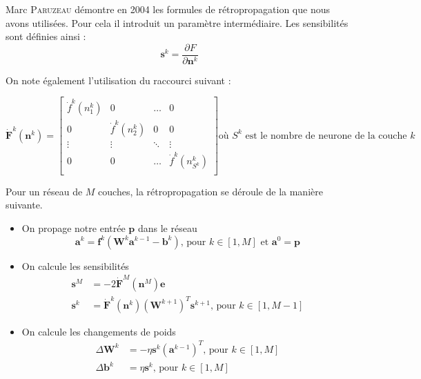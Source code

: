 Marc \textsc{Paruzeau} démontre en 2004 les formules de rétropropagation que nous avons utilisées. Pour cela il introduit un paramètre %
intermédiaire. Les sensibilités sont définies ainsi :
\begin{equation}
 \mathbf{s}^k = \frac{\partial F}{\partial \mathbf{n}^k}
\end{equation}

On note également l'utilisation du raccourci suivant : 

\begin{equation}
  \displaystyle
 \mathbf{\dot F}^k(\mathbf{n}^k) =
 \begin{bmatrix}
  \dot f ^k(n^k_1) & 0 & \ldots & 0\\
  0 & \dot f^k(n^k_2) & 0 & 0\\
  \vdots & \vdots & \ddots & \vdots \\
  0 & 0 & \ldots & \dot f^k(n^k_{S^k})\\
 \end{bmatrix}
 \text{où $S^k$ est le nombre de neurone de la couche $k$}
\end{equation}

Pour un réseau de $M$ couches, la rétropropagation se déroule de la manière suivante.
\begin{itemize}
 \item On propage notre entrée $\mathbf{p}$ dans le réseau
 \begin{equation}
   \mathbf{a}^k = \mathbf{f}^k(\mathbf{W}^k\mathbf{a}^{k-1} - \mathbf{b}^k) \text{, pour $k \in [1,M]$ et $\mathbf{a}^0 = \mathbf{p}$}
 \end{equation}
 
 \item On calcule les sensibilités 
 \begin{align}
  \mathbf{s}^M &= -2\mathbf{\dot F}^M(\mathbf{n}^M)\mathbf{e} \\
  \mathbf{s}^k &= \mathbf{\dot F}^k(\mathbf{n}^k)(\mathbf{W}^{k+1})^T \mathbf{s}^{k+1} \text{, pour $k \in [1,M-1]$}
 \end{align}
 
 \item On calcule les changements de poids
 \begin{align}
  \Delta \mathbf{W}^k &= - \eta \mathbf{s}^k(\mathbf{a}^{k-1})^T \text{, pour $k \in [1,M]$} \\
  \Delta \mathbf{b}^k &= \eta \mathbf{s}^k \text{, pour $k \in [1,M]$}
 \end{align}



\end{itemize}








